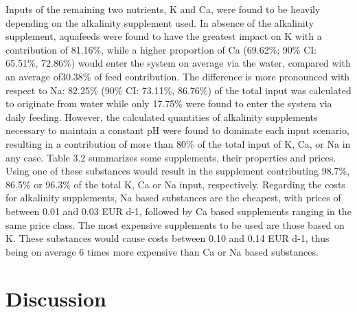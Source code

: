 \documentclass[preprint, 3p,
authoryear]{elsarticle} %
\begin{document}
Inputs of the remaining two nutrients, K and Ca, were found to be
heavily depending on the alkalinity supplement used. In absence of the
alkalinity supplement, aquafeeds were found to have the greatest impact
on K with a contribution of 81.16\%, while a higher proportion of Ca
(69.62\%; 90\% CI: 65.51\%, 72.86\%) would enter the system on average
via the water, compared with an average of30.38\% of feed contribution.
The difference is more pronounced with respect to Na: 82.25\% (90\% CI:
73.11\%, 86.76\%) of the total input was calculated to originate from
water while only 17.75\% were found to enter the system via daily
feeding. However, the calculated quantities of alkalinity supplements
necessary to maintain a constant pH were found to dominate each input
scenario, resulting in a contribution of more than 80\% of the total
input of K, Ca, or Na in any case. Table 3.2 summarizes some
supplements, their properties and prices. Using one of these substances
would result in the supplement contributing 98.7\%, 86.5\% or 96.3\% of
the total K, Ca or Na input, respectively. Regarding the costs for
alkalinity supplements, Na based substances are the cheapest, with
prices of between 0.01 and 0.03 EUR d-1, followed by Ca based
supplements ranging in the same price class. The most expensive
supplements to be used are those based on K. These substances would
cause costs between 0.10 and 0.14 EUR d-1, thus being on average 6 times
more expensive than Ca or Na based substances.

\hypertarget{discussion}{%
\section{Discussion}\label{discussion}}
\end{document}
